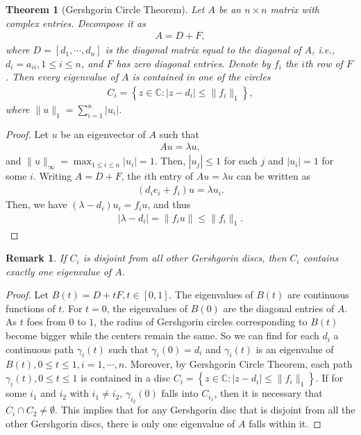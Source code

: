 \documentclass[11pt]{book}
\newtheorem{theorem}{Theorem}[chapter]
\newtheorem{remark}{Remark}[chapter]
\theoremstyle{definition}
\numberwithin{equation}{chapter}
\begin{document}
\begin{subappendices}
\begin{theorem}[Gershgorin Circle Theorem]
Let $A$ be an $n \times n$ matrix with complex entries. Decompose it as 
\begin{align*}
    A = D + F,
\end{align*}
where $D = \left[d_1, \cdots, d_n\right]$ is the diagonal matrix equal to the diagonal of $A$, i.e., $d_i = a_{ii}, 1 \leq i \leq n$, and $F$ has zero diagonal entries. Denote by $f_i$ the $i$th row of $F$. Then every eigenvalue of $A$ is contained in one of the circles
\begin{align*}
    C_i = \left\{z \in \mathbb{C}: |z - d_i| \leq \|f_i\|_1 \right\},
\end{align*}
where $\|u\|_1 = \sum^n_{i=1} |u_i|$.
\end{theorem}
\begin{proof}
Let $u$ be an eigenvector of $A$ such that
\begin{align*}
    Au = \lambda u,
\end{align*}
and $\|u\|_\infty = \max_{1\leq i \leq n}|u_i| = 1$. Then, $|u_j| \leq 1$ for each $j$ and $|u_i| = 1$ for some $i$. Writing $A = D + F$, the $i$th entry of $Au = \lambda u$ can be written as 
\begin{align*}
    (d_i e_i + f_i)u = \lambda u_i.
\end{align*}
Then, we have $(\lambda - d_i)u_i = f_i u$, and thus
\begin{align*}
    |\lambda - d_i| = \|f_i u\| \leq \|f_i\|_1.
\end{align*}
\end{proof}

\begin{remark}
If $C_i$ is disjoint from all other Gershgorin discs, then $C_i$ contains exactly one eigenvalue of $A$.
\end{remark}
\begin{proof}
Let $B(t) = D + tF, t \in [0,1]$. The eigenvalues of $B(t)$ are continuous functions of $t$. For $t = 0$, the eigenvalues of $B(0)$ are the diagonal entries of $A$. As $t$ foes from $0$ to $1$, the radius of Gershgorin circles corresponding to $B(t)$ become bigger while the centers remain the same. So we can find for each $d_i$ a continuous path $\gamma_i(t)$ such that $\gamma_i(0) = d_i$ and $\gamma_i(t)$ is an eigenvalue of $B(t), 0 \leq t \leq 1, i = 1, \cdots, n$. Moreover, by Gershgorin Circle Theorem, each path $\gamma_i(t), 0 \leq t \leq 1$ is contained in a disc $C_i = \left\{z \in \mathbb{C}: |z - d_i| \leq \|f_i\|_1 \right\}$. If for some $i_1$ and $i_2$ with $i_1 \neq i_2$, $\gamma_{i_2}(0)$ falls into $C_{i_1}$, then it is necessary that $C_i \cap C_2 \neq \emptyset$. This implies that for any Gershgorin disc that is disjoint from all the other Gershgorin discs, there is only one eigenvalue of $A$ falls within it.
\end{proof}







\end{subappendices}
\end{document}
